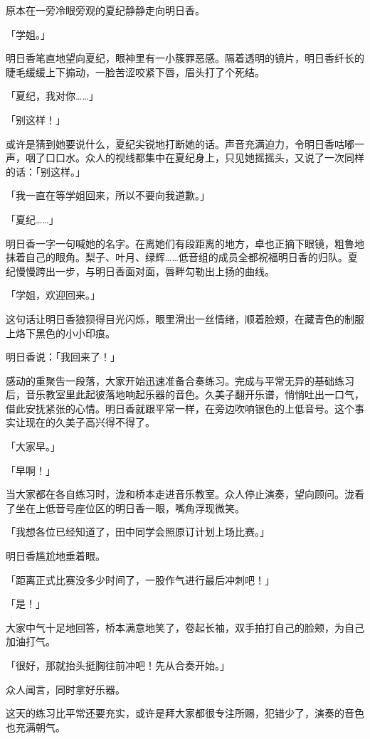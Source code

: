 \documentclass[UTF8]{ctexart}
\begin{document}
    原本在一旁冷眼旁观的夏纪静静走向明日香。 

    「学姐。」 

    明日香笔直地望向夏纪，眼神里有一小簇罪恶感。隔着透明的镜片，明日香纤长的睫毛缓缓上下搧动，一脸苦涩咬紧下唇，眉头打了个死结。 

    「夏纪，我对你……」 

    「别这样！」 

    或许是猜到她要说什么，夏纪尖锐地打断她的话。声音充满迫力，令明日香咕嘟一声，咽了口口水。众人的视线都集中在夏纪身上，只见她摇摇头，又说了一次同样的话：「别这样。」 

    「我一直在等学姐回来，所以不要向我道歉。」 

    「夏纪……」 

    明日香一字一句喊她的名字。在离她们有段距离的地方，卓也正摘下眼镜，粗鲁地抹着自己的眼角。梨子、叶月、绿辉……低音组的成员全都祝福明日香的归队。夏纪慢慢跨出一步，与明日香面对面，唇畔勾勒出上扬的曲线。 

    「学姐，欢迎回来。」 

    这句话让明日香狼狈得目光闪烁，眼里滑出一丝情绪，顺着脸颊，在藏青色的制服上烙下黑色的小小印痕。 

    明日香说：「我回来了！」 

    感动的重聚告一段落，大家开始迅速准备合奏练习。完成与平常无异的基础练习后，音乐教室里此起彼落地响起乐器的音色。久美子翻开乐谱，悄悄吐出一口气，借此安抚紧张的心情。明日香就跟平常一样，在旁边吹响银色的上低音号。这个事实让现在的久美子高兴得不得了。 

    「大家早。」 

    「早啊！」 

    当大家都在各自练习时，泷和桥本走进音乐教室。众人停止演奏，望向顾问。泷看了坐在上低音号座位区的明日香一眼，嘴角浮现微笑。 

    「我想各位已经知道了，田中同学会照原订计划上场比赛。」 

    明日香尴尬地垂着眼。 

    「距离正式比赛没多少时间了，一股作气进行最后冲刺吧！」 

    「是！」 

    大家中气十足地回答，桥本满意地笑了，卷起长袖，双手拍打自己的脸颊，为自己加油打气。 

    「很好，那就抬头挺胸往前冲吧！先从合奏开始。」 

    众人闻言，同时拿好乐器。 

    这天的练习比平常还要充实，或许是拜大家都很专注所赐，犯错少了，演奏的音色也充满朝气。 
\end{document}
